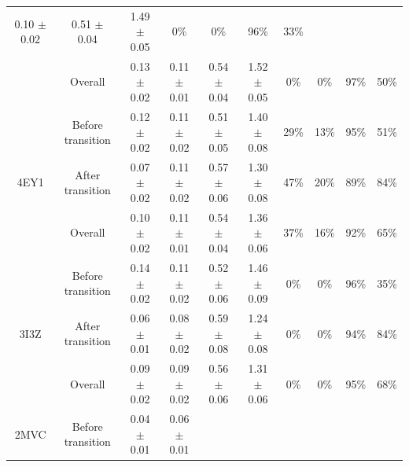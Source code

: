 \documentclass[9pt]{elife}
\begin{document}
\begin{table}[H]
{\begin{tabular}{cc|cc|cc|cccc|}
  0.10 $\pm$ 0.02 &
  \multicolumn{1}{c|}{0.51 $\pm$ 0.04} &
  1.49 $\pm$ 0.05 &
  \multicolumn{1}{c|}{0\%} &
  \multicolumn{1}{c|}{0\%} &
  \multicolumn{1}{c|}{96\%} &
  33\% \\ \cline{2-10} 
\multicolumn{1}{|c|}{} &
  Overall &
  \multicolumn{1}{c|}{0.13 $\pm$ 0.02} &
  0.11 $\pm$ 0.01 &
  \multicolumn{1}{c|}{0.54 $\pm$ 0.04} &
  1.52 $\pm$ 0.05 &
  \multicolumn{1}{c|}{0\%} &
  \multicolumn{1}{c|}{0\%} &
  \multicolumn{1}{c|}{97\%} &
  50\% \\ \hline
\multicolumn{1}{|c|}{\multirow{3}{*}{4EY1}} &
  Before transition &
  \multicolumn{1}{c|}{0.12 $\pm$ 0.02} &
  0.11 $\pm$ 0.02 &
  \multicolumn{1}{c|}{0.51 $\pm$ 0.05} &
  1.40 $\pm$ 0.08 &
  \multicolumn{1}{c|}{29\%} &
  \multicolumn{1}{c|}{13\%} &
  \multicolumn{1}{c|}{95\%} &
  51\% \\ \cline{2-10} 
\multicolumn{1}{|c|}{} &
  After transition &
  \multicolumn{1}{c|}{0.07 $\pm$ 0.02} &
  0.11 $\pm$ 0.02 &
  \multicolumn{1}{c|}{0.57 $\pm$ 0.06} &
  1.30 $\pm$ 0.08 &
  \multicolumn{1}{c|}{47\%} &
  \multicolumn{1}{c|}{20\%} &
  \multicolumn{1}{c|}{89\%} &
  84\% \\ \cline{2-10} 
\multicolumn{1}{|c|}{} &
  Overall &
  \multicolumn{1}{c|}{0.10 $\pm$ 0.02} &
  0.11 $\pm$ 0.01 &
  \multicolumn{1}{c|}{0.54 $\pm$ 0.04} &
  1.36 $\pm$ 0.06 &
  \multicolumn{1}{c|}{37\%} &
  \multicolumn{1}{c|}{16\%} &
  \multicolumn{1}{c|}{92\%} &
  65\% \\ \hline
\multicolumn{1}{|c|}{\multirow{3}{*}{3I3Z}} &
  Before transition &
  \multicolumn{1}{c|}{0.14 $\pm$ 0.02} &
  0.11 $\pm$ 0.02 &
  \multicolumn{1}{c|}{0.52 $\pm$ 0.06} &
  1.46 $\pm$ 0.09 &
  \multicolumn{1}{c|}{0\%} &
  \multicolumn{1}{c|}{0\%} &
  \multicolumn{1}{c|}{96\%} &
  35\% \\ \cline{2-10} 
\multicolumn{1}{|c|}{} &
  After transition &
  \multicolumn{1}{c|}{0.06 $\pm$ 0.01} &
  0.08 $\pm$ 0.02 &
  \multicolumn{1}{c|}{0.59 $\pm$ 0.08} &
  1.24 $\pm$ 0.08 &
  \multicolumn{1}{c|}{0\%} &
  \multicolumn{1}{c|}{0\%} &
  \multicolumn{1}{c|}{94\%} &
  84\% \\ \cline{2-10} 
\multicolumn{1}{|c|}{} &
  Overall &
  \multicolumn{1}{c|}{0.09 $\pm$ 0.02} &
  0.09 $\pm$ 0.02 &
  \multicolumn{1}{c|}{0.56 $\pm$ 0.06} &
  1.31 $\pm$ 0.06 &
  \multicolumn{1}{c|}{0\%} &
  \multicolumn{1}{c|}{0\%} &
  \multicolumn{1}{c|}{95\%} &
  68\% \\ \hline
\multicolumn{1}{|c|}{\multirow{3}{*}{2MVC}} &
  Before transition &
  \multicolumn{1}{c|}{0.04 $\pm$ 0.01} &
  0.06 $\pm$ 0.01 &

\end{tabular}}
\end{table}
\end{document}

